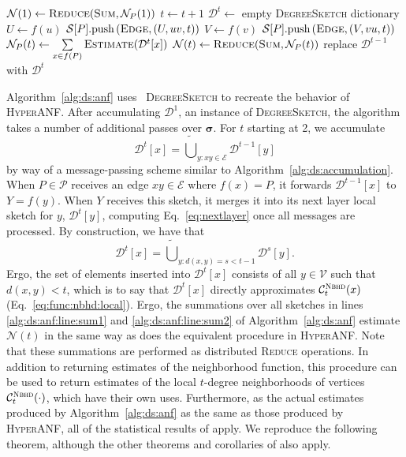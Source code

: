 \documentclass[10]{article}
\newcommand{\push}[1]{\text{push} \left ( #1 \right )}
\newcommand{\algoname}[1]{\textnormal{\textsc{#1}}}
\begin{document}
\begin{algorithm}[htbp]
\begin{flushleft}
\begin{algorithmic}[1]
		\State $\mathcal{N}(1) \gets \algoname{Reduce}(\algoname{Sum}, \mathcal{N}_P(1))$
			\State $t \gets t + 1$
			\State $\mathcal{D}^t \gets $ empty \algoname{DegreeSketch} dictionary
				\State $U \gets f(u)$
	 			\State $\mathcal{S}[P].\push{\algoname{Edge}, (U, uv, t)}$
				\State $V \gets f(v)$
 				\State $\mathcal{S}[P].\push{\algoname{Edge}, (V, vu, t)}$
			\EndWhile
			\State $\mathcal{N}_P(t) \gets \sum\limits_{x \in f(P)} \algoname{Estimate}(\mathcal{D}^t[x])$ \label{alg:ds:anf:line:sum2}
			\State $\mathcal{N}(t) \gets \algoname{Reduce}(\algoname{Sum}, \mathcal{N}_P(t))$
			\State replace $\mathcal{D}^{t-1}$ with $\mathcal{D}^t$
		\EndWhile
\end{algorithmic}
\end{flushleft}
\end{algorithm}

Algorithm~\ref{alg:ds:anf} uses ~\algoname{DegreeSketch} to recreate the behavior of \algoname{HyperANF}.
After accumulating $\mathcal{D}^1$, an instance of \algoname{DegreeSketch}, the algorithm takes a number of additional passes over $\boldsymbol{\sigma}$. 
For $t$ starting at 2, we accumulate 
%
\begin{equation} \label{eq:nextlayer}
\mathcal{D}^t[x] = \widetilde{\bigcup}_{y: xy \in \mathcal{E}} \mathcal{D}^{t-1}[y]
\end{equation}
%
by way of a message-passing scheme similar to Algorithm~\ref{alg:ds:accumulation}.
When $P \in \mathcal{P}$ receives an edge $xy \in \mathcal{E}$ where $f(x) = P$, it forwards $\mathcal{D}^{t-1}[x]$ to $Y = f(y)$.
When $Y$ receives this sketch, it merges it into its next layer local sketch for $y$, $\mathcal{D}^t[y]$, computing Eq.~\eqref{eq:nextlayer} once all messages are processed.
By construction, we have that
%
\begin{equation} \label{eq:nextlayer:full}
\mathcal{D}^t[x] = \widetilde{\bigcup}_{y: d(x,y) = s < t-1} \mathcal{D}^{s}[y].
\end{equation}
%
Ergo, the set of elements inserted into $\mathcal{D}^t[x]$ consists of all $y \in \mathcal{V}$ such that $d(x,y) < t$, which is to say that $\mathcal{D}^t[x]$ directly approximates $\mathcal{C}^{\algoname{Nbhd}}_t(x)$ (Eq.~\eqref{eq:func:nbhd:local}). 
Ergo, the summations over all sketches in lines \ref{alg:ds:anf:line:sum1} and \ref{alg:ds:anf:line:sum2} of Algorithm~\ref{alg:ds:anf} estimate $\mathcal{N}(t)$ in the same way as does the equivalent procedure in \algoname{HyperANF}.
Note that these summations are performed as distributed \algoname{Reduce} operations.
In addition to returning estimates of the neighborhood function, this procedure can be used to return estimates of the local $t$-degree neighborhoods of vertices $\mathcal{C}^{\algoname{Nbhd}}_t(\cdot)$, which have their own uses.
Furthermore, as the actual estimates produced by Algorithm~\ref{alg:ds:anf} as the same as those produced by \algoname{HyperANF}, all of the statistical results of \cite{boldi2011hyperanf} apply.
We reproduce the following theorem, although the other theorems and corollaries of \cite{boldi2011hyperanf} also apply. 
\end{document}
